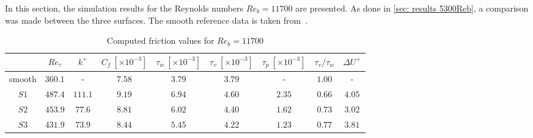 In this section, the simulation results for the Reynolds numbers $Re_b = 11700$ are presented.
As done in \autoref{sec: results 5300Reb}, a comparison was made between the three surfaces.
The smooth reference data is taken from~\cite{elkhouryDirectNumericalSimulation2013}.
\begin{table}
    \centering
    \caption[Computed friction values for $Re_b = 11700$]{Computed friction values for $Re_b = 11700$}
    \begin{tabular}{c c c c c c c c c}
        \toprule
                & $Re_\tau$ & $k^+$     & $C_f\ [\times10^{-3}]$ & $\tau_w\ [\times10^{-3}]$    & $\tau_v\ [\times10^{-3}]$ & $\tau_p\ [\times10^{-3}]$ & $\tau_v/\tau_w$   & $\Delta U^+$\\
        \midrule
        smooth  & $360.1$   & -         & $7.58$                & $3.79$                        & $3.79$                    & -                         & $1.00$            & - \\
        $S1$    & $487.4$   & $111.1$   & $9.19$                & $6.94$                        & $4.60$                    & $2.35$                    & $0.66$            & $4.05$\\
        $S2$    & $453.9$   & $77.6$    & $8.81$                & $6.02$                        & $4.40$                    & $1.62$                    & $0.73$            & $3.02$\\
        $S3$    & $431.9$   & $73.9$    & $8.44$                & $5.45$                        & $4.22$                    & $1.23$                    & $0.77$            & $3.81$\\
        \bottomrule
    \end{tabular}
    \label{tab: friction values 11700 Reb}
\end{table}
